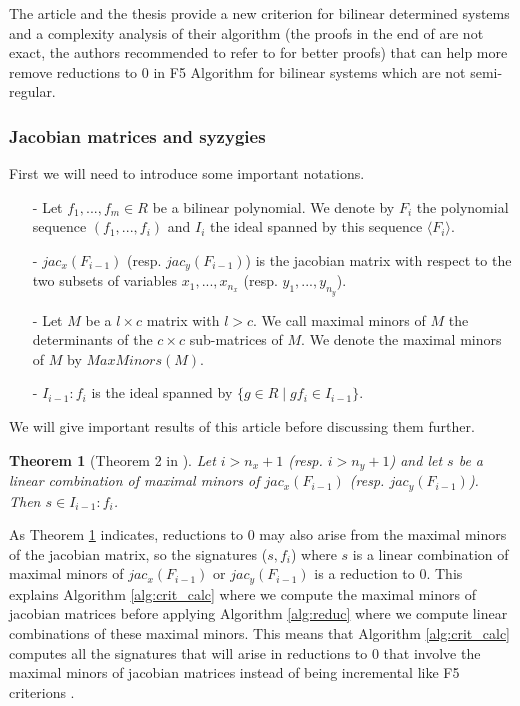 \documentclass[english]{article}
\newtheorem{theorem}{Theorem}[section]
\begin{document}
		The article \cite{FSS11} and the thesis \cite{Spaen2012} provide a new criterion for bilinear determined systems and a complexity analysis of their algorithm (the proofs in the end of \cite{FSS11} are not exact, the authors recommended to refer to \cite{Spaen2012} for better proofs) that can help more remove reductions to 0 in F5 Algorithm for bilinear systems which are not semi-regular.
		
		\subsubsection{Jacobian matrices and syzygies}
		First we will need to introduce some important notations.
		\begin{itemize}
			\item[-] Let $f_1,...,f_m \in R$ be a bilinear polynomial. We denote by $F_i$ the polynomial sequence $(f_1,...,f_i)$ and $I_i$ the ideal spanned by this sequence $\langle F_i \rangle$.
			\item[-] $jac_{x}(F_{i-1})$ (resp. $jac_{y}(F_{i-1})$) is the jacobian matrix with respect to the two subsets of variables $x_1,...,x_{n_x}$ (resp. $y_1,...,y_{n_y}$).
			\item[-] Let $M$ be a $l \times c$ matrix with $l > c$. We call maximal minors of $M$ the determinants of the $c \times c$ sub-matrices of $M$. We denote the maximal minors of $M$ by $MaxMinors(M)$.
			\item[-] $I_{i-1} : f_i$ is the ideal spanned by $\{g \in R \mid gf_i \in I_{i-1}\}$.
		\end{itemize}
		We will give important results of this article before discussing them further.
		
		\begin{theorem}[Theorem 2 in \cite{FSS11}]\label{theoremMaxMin}
			Let $i > n_x + 1$ (resp. $i > n_y + 1$) and let $s$ be a linear combination of maximal minors of $jac_{x}(F_{i-1})$ (resp. $jac_{y}(F_{i-1})$). Then $s \in I_{i-1} : f_i$.
		\end{theorem}
		
		As Theorem \ref{theoremMaxMin} indicates, reductions to 0 may also arise from the maximal minors of the jacobian matrix, so the signatures ($s, f_i$) where $s$ is a linear combination of maximal minors of $jac_{x}(F_{i-1})$ or $jac_{y}(F_{i-1})$ is a reduction to 0.
		This explains Algorithm \ref{alg:crit_calc} where we compute the maximal minors of jacobian matrices before applying Algorithm \ref{alg:reduc} where we compute linear combinations of these maximal minors.
		This means that Algorithm \ref{alg:crit_calc} computes all the signatures that will arise in reductions to 0 that involve the maximal minors of jacobian matrices instead of being incremental like F5 criterions \cite{F02}.
					
\end{document}

